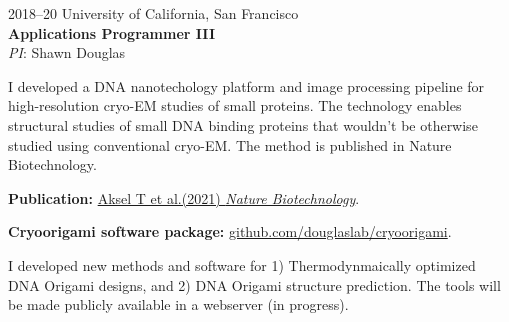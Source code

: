 \documentclass[12pt,letterpaper]{report}
\newcommand{\listitemspace}{0.25em}
\renewenvironment{itemize}
{\begin{list}{}{\setlength{\leftmargin}{0em}
                \setlength{\parskip}{0em}
                \setlength{\itemsep}{\listitemspace}
                \setlength{\parsep}{\listitemspace}}}
{\end{list}}
\begin{document}
\begin{tablist}
        \item[2018--20] \tab{}University of California, San Francisco \\
                             \textbf{Applications Programmer III} \\
                             \textit{PI}: Shawn Douglas \\
                             \begin{itemize}
                                \item \textbullet \hspace{0.2cm} I developed a DNA nanotechology platform and image processing pipeline for high-resolution cryo-EM studies of small proteins. The technology enables structural studies of small DNA binding proteins that wouldn't be otherwise studied using conventional cryo-EM. The method is published in Nature Biotechnology. 
                                \begin{itemize}
                                    \item \hspace{1cm} \textbf{Publication:} \href{https://doi.org/10.1038/s41587-020-0716-8}{Aksel T et al.(2021) \textit{Nature Biotechnology}}. 
                                    \item \hspace{1cm} \textbf{Cryoorigami software package:} \href{https://github.com/douglaslab/cryoorigami} {github.com/douglaslab/cryoorigami}. 
                                \end{itemize}
                                \item \textbullet \hspace{0.2cm} I developed new methods and software for 1) Thermodynmaically optimized DNA Origami designs, and 2) DNA Origami structure prediction. The tools will be made publicly available in a webserver (in progress).
                             \end{itemize} 


\end{tablist}
\end{document}

